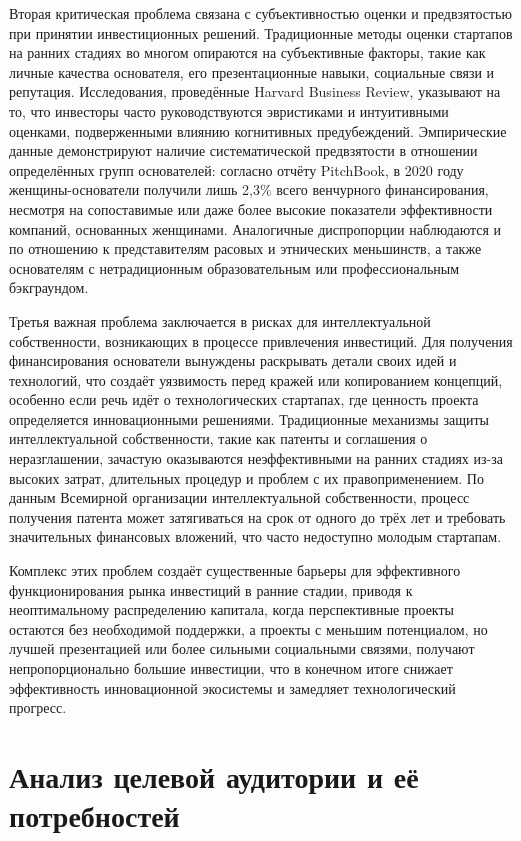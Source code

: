 \documentclass[
    candidate, %
    subf, %
    dotsinheaders=false,
]{disser}
\begin{document}
Вторая критическая проблема связана с субъективностью оценки и предвзятостью при принятии инвестиционных решений. Традиционные методы оценки стартапов на ранних стадиях во многом опираются на субъективные факторы, такие как личные качества основателя, его презентационные навыки, социальные связи и репутация. Исследования, проведённые Harvard Business Review, указывают на то, что инвесторы часто руководствуются эвристиками и интуитивными оценками, подверженными влиянию когнитивных предубеждений. Эмпирические данные демонстрируют наличие систематической предвзятости в отношении определённых групп основателей: согласно отчёту PitchBook, в 2020 году женщины-основатели получили лишь 2,3\% всего венчурного финансирования, несмотря на сопоставимые или даже более высокие показатели эффективности компаний, основанных женщинами. Аналогичные диспропорции наблюдаются и по отношению к представителям расовых и этнических меньшинств, а также основателям с нетрадиционным образовательным или профессиональным бэкграундом.

Третья важная проблема заключается в рисках для интеллектуальной собственности, возникающих в процессе привлечения инвестиций. Для получения финансирования основатели вынуждены раскрывать детали своих идей и технологий, что создаёт уязвимость перед кражей или копированием концепций, особенно если речь идёт о технологических стартапах, где ценность проекта определяется инновационными решениями. Традиционные механизмы защиты интеллектуальной собственности, такие как патенты и соглашения о неразглашении, зачастую оказываются неэффективными на ранних стадиях из-за высоких затрат, длительных процедур и проблем с их правоприменением. По данным Всемирной организации интеллектуальной собственности, процесс получения патента может затягиваться на срок от одного до трёх лет и требовать значительных финансовых вложений, что часто недоступно молодым стартапам.

Комплекс этих проблем создаёт существенные барьеры для эффективного функционирования рынка инвестиций в ранние стадии, приводя к неоптимальному распределению капитала, когда перспективные проекты остаются без необходимой поддержки, а проекты с меньшим потенциалом, но лучшей презентацией или более сильными социальными связями, получают непропорционально большие инвестиции, что в конечном итоге снижает эффективность инновационной экосистемы и замедляет технологический прогресс.

\section{Анализ целевой аудитории и её потребностей}
\end{document}
